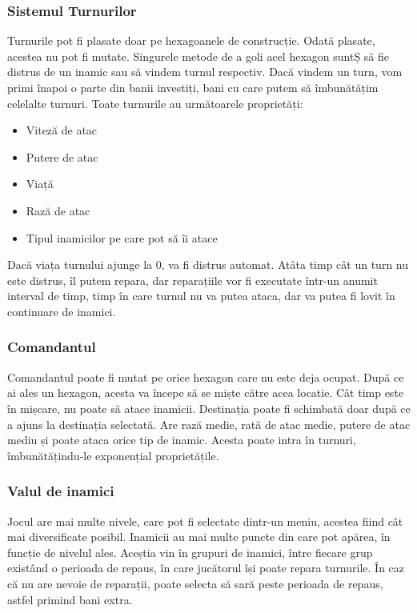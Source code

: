 \documentclass[12pt, a4paper]{article}
\begin{document}
	
	
	
	\subsubsection{Sistemul Turnurilor}
	
	Turnurile pot fi plasate doar pe hexagoanele de construcție. Odată plasate, acestea nu pot fi mutate. Singurele metode de a goli acel hexagon suntȘ să fie distrus de un inamic sau să vindem turnul respectiv. Dacă vindem un turn, vom primi înapoi o parte din banii investiți, bani cu care putem să îmbunătățim celelalte turnuri. Toate turnurile au următoarele proprietăți:
	
	\begin{itemize}
		\item Viteză de atac
		\item Putere de atac
		\item Viață
		\item Rază de atac
		\item Tipul inamicilor pe care pot să îi atace
	\end{itemize}
	
	Dacă viața turnului ajunge la 0, va fi distrus automat. Atâta timp cât un turn nu este distrus, îl putem repara, dar reparațiile vor fi executate într-un anumit interval de timp, timp în care turnul nu va putea ataca, dar va putea fi lovit în continuare de inamici.
	
	
	
	
	
	\subsubsection{Comandantul}
	
	Comandantul poate fi mutat pe orice hexagon care nu este deja ocupat. După ce ai ales un hexagon, acesta va începe să se miște către acea locatie. Cât timp este în mișcare, nu poate să atace inamicii. Destinația poate fi schimbată doar după ce a ajuns la destinația selectată. Are rază medie, rată de atac medie, putere de atac mediu și poate ataca orice tip de inamic. Acesta poate intra în turnuri, îmbunătățindu-le exponențial proprietățile.
	
	
	
	\subsubsection{Valul de inamici}
	
	Jocul are mai multe nivele, care pot fi selectate dintr-un meniu, acestea fiind cât mai diversificate posibil. Inamicii au mai multe puncte din care pot apărea, în funcție de nivelul ales. Aceștia vin în grupuri de inamici, între fiecare grup existând o perioada de repaus, în care jucătorul își poate repara turnurile. În caz că nu are nevoie de reparații, poate selecta să sară peste perioada de repaus, astfel primind bani extra.
	
\end{document}
